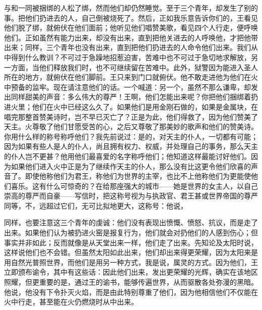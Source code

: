 与和一同被捆绑的人松了绑，然而他们却仍然睡觉。至于三个青年，却发生了别的事。把他们扔进去的人，自己倒被烧死了。然后，正如我乐意告诉你们的，王看见他们脱了绑，就俯伏在他们面前；他听见他们唱赞美歌，看见四个人行走，便呼唤他们。正如虽然有能力出来，却没有出来，直到把他关进去的人呼唤他，才把他带出来；同样，三个青年也没有出来，直到把他们扔进去的人命令他们出来。我们从中得到什么教训？不可过于急躁地招惹迫害，苦难中也不可过于急切地求解放，另一方面，当他们释放我们时，也不可继续留在苦难中。此外，狱警因为能进入圣人所在的地方，就俯伏在他们脚前。王只来到门口就俯伏。他不敢走进他为他们在火中预备的监牢。现在请注意他们的话。一个喊道：另一个，虽然不那么谦卑，却发出同样甜美的声音：多么伟大的尊严！王啊，他们怎能出来呢？你把他们捆绑着扔进火里；他们在火中已经这么久了。如果他们是用金刚石做的，如果是金属块，在唱完那整首赞美诗时，岂不早已灭亡了？正是为此，他们得救了，因为他们赞美了天主。火尊敬了他们甘愿受苦的心，之后又尊敬了那美妙的歌声和他们的赞美诗。你用什么样的称号称呼他们？我先前说过：是的，对天主的仆人，一切都有可能；因为如果有些人是人的仆人，尚且拥有权力、权威，并处理自己的事务，那么天主的仆人岂不更甚？他用他们最喜爱的名字称呼他们；他知道这样最能讨好他们。因为如果他们进入火中正是为了继续作天主的仆人，那么没有比这更令他们欣喜的声音了。即使他称他们为君王，称他们为世界的主宰，也比不上他称他们为更能使他们喜乐。这有什么可惊奇的？在给那座强大的城市——她是世界的女主人，以自己崇高的尊严而自豪——写信时，把这称号视为与执政官、君王甚或世界帝国的尊严同等，不，远超过它们，无可比拟地更大，这称号：他说，\par

同样，也要注意这三个青年的虔诚：他们没有表现出愤慨、愤怒、抗议，而是走了出来。如果他们认为被扔进火窑是报复行为，他们就会对扔他们的人感到伤心；但事实并非如此；反而就像是从天堂出来一样，他们走了出来。先知论及太阳时说，这样说他们也不会错。但虽然太阳如此出来，他们却出来得更荣耀，因为太阳来是用自然光普照世界，而他们是用另一种方式，我是说，属灵的方式。因为他们，王立即颁布谕令，其中有这些话：因此他们出来，发出更荣耀的光辉，确实在该地区照耀，但更重要的是，通过王的谕书，能够传遍世界，从而驱散各处弥漫的黑暗。他说，他没有下令扑灭火焰，而是由此特别尊重了他们，因为他相信他们不仅能在火中行走，甚至能在火仍燃烧时从中出来。\par

